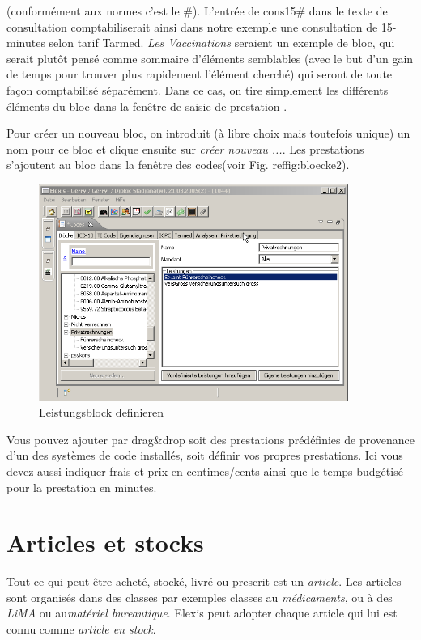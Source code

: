 (conformément aux normes c'est le \#). L'entrée de cons15\# dans le texte de consultation comptabiliserait ainsi dans notre exemple une consultation de 15-minutes selon tarif Tarmed.
\textit{Les Vaccinations} seraient un exemple de bloc, qui serait plutôt pensé comme sommaire d'éléments semblables
(avec le but d'un gain de temps pour trouver plus rapidement l'élément cherché) qui seront de toute façon comptabilisé
séparément. Dans ce cas, on tire simplement les différents éléments du bloc dans la fenêtre de saisie de prestation .


Pour créer un nouveau bloc, on introduit (à libre choix mais toutefois unique) un nom pour ce bloc et clique ensuite sur \textit{créer nouveau ...}. Les prestations s'ajoutent au bloc dans la fenêtre des codes(voir  Fig. ref{fig:bloecke2}).
\begin{figure}[htp]
\includegraphics[width=0.9\textwidth]{images/block2}
\caption{Leistungsblock definieren}
\label{fig:bloecke2}
\end{figure}
Vous pouvez ajouter par drag\&drop soit des prestations prédéfinies de provenance d'un des systèmes de code installés, soit définir vos propres prestations. Ici vous devez aussi indiquer frais et prix en centimes/cents ainsi que le temps budgétisé pour la prestation en minutes.


\section{Articles et stocks}
 Tout ce qui peut être acheté, stocké, livré ou prescrit est un  \textit{article}.
 Les articles sont organisés dans des classes par exemples classes au \textit{médicaments},
 ou à des  \textit{LiMA} ou au\textit{matériel bureautique}.
 Elexis peut adopter chaque article qui lui est connu comme \textit{article en stock}.

